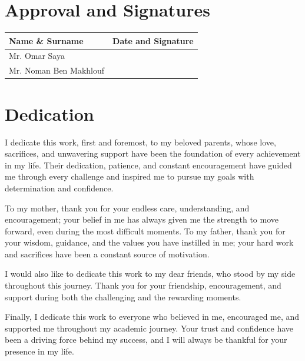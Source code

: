 \documentclass[12pt,a4paper,oneside]{report}
\newcommand{\myProSupervisor}{Mr. Omar Saya}
\newcommand{\myAcadSupervisor}{Mr. Noman Ben Makhlouf}
\begin{document}
\chapter*{Approval and Signatures}
\vspace{1cm}
\renewcommand{\arraystretch}{3}
\begin{center}
\begin{tabular}{|p{6cm}|p{6cm}|}
\hline
\textbf{Name \& Surname} & \textbf{Date and Signature} \\ \hline
\myProSupervisor & \\ \hline
\myAcadSupervisor & \\ \hline
\end{tabular}
\end{center}
\renewcommand{\arraystretch}{1}

\chapter*{Dedication}
\thispagestyle{fancy}

I dedicate this work, first and foremost, to my beloved parents, whose love,
sacrifices, and unwavering support have been the foundation of every
achievement in my life. Their dedication, patience, and constant encouragement
have guided me through every challenge and inspired me to pursue my goals with
determination and confidence.

\medskip
To my mother, thank you for your endless care, understanding, and
encouragement; your belief in me has always given me the strength to move
forward, even during the most difficult moments. To my father, thank you for
your wisdom, guidance, and the values you have instilled in me; your hard work
and sacrifices have been a constant source of motivation.

\medskip
I would also like to dedicate this work to my dear friends, who stood by my
side throughout this journey. Thank you for your friendship, encouragement, and
support during both the challenging and the rewarding moments.

\medskip
Finally, I dedicate this work to everyone who believed in me, encouraged me, and
supported me throughout my academic journey. Your trust and confidence have been
a driving force behind my success, and I will always be thankful for your
presence in my life.
\end{document}
